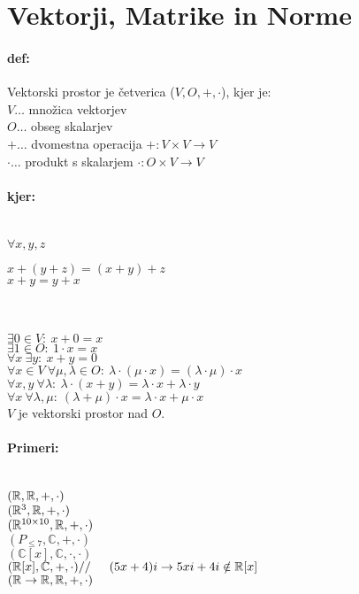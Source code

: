 \section{Vektorji, Matrike in Norme} 

\paragraph{def:} Vektorski prostor je četverica ($V, O, +, \cdot$), kjer je:\\
\indent $V \dots$ množica vektorjev\\
\indent $O \dots$ obseg skalarjev\\
\indent $+ \dots$ dvomestna operacija $+: V \times V \rightarrow V$\\
\indent $\cdot \dots$ produkt s skalarjem $\cdot: O \times V \rightarrow V$\\

\paragraph{kjer:}\ \\
\indent $\forall x, y, z$\indent 
\begin{minipage}{0.5\textwidth}
	$x + (y + z) = (x + y) + z$\\
	$x + y = y + x$
\end{minipage}\\\\
\indent $\exists 0 \in V:\ x+0 = x$\\
\indent $\exists 1 \in O:\ 1\cdot x = x$\\
\indent $\forall x\ \exists y:\ x + y = 0$\\
\indent $\forall x \in V\ \forall \mu, \lambda \in O:\ \lambda \cdot (\mu \cdot x) = (\lambda \cdot \mu) \cdot x$\\
\indent $\forall x,y\ \forall \lambda :\ \lambda \cdot (x + y) = \lambda \cdot x + \lambda \cdot y$\\
\indent $\forall x\ \forall \lambda, \mu :\ (\lambda + \mu) \cdot x = \lambda \cdot x + \mu \cdot x$\\

\noindent $V$ je vektorski prostor nad $O$.
\paragraph{Primeri:}\ \\
\indent $(\mathbb{R}, \mathbb{R}, +, \cdot)$\\
\indent $(\mathbb{R}^3, \mathbb{R}, +, \cdot)$\\
\indent $(\mathbb{R}^{10\times 10}, \mathbb{R}, +, \cdot)$\\
\indent $(P_{\leq 7}, \mathbb{C}, +, \cdot)$\\
\indent $(\mathbb{C}[x], \mathbb{C}, \cdot, \cdot)$\\
\indent $(\R[x], \mathbb{C}, +, \cdot) // \indent (5x + 4)i \rightarrow 5xi + 4i \notin \R[x]$\\
\indent $(\mathbb{R} \rightarrow \mathbb{R}, \mathbb{R}, +, \cdot)$